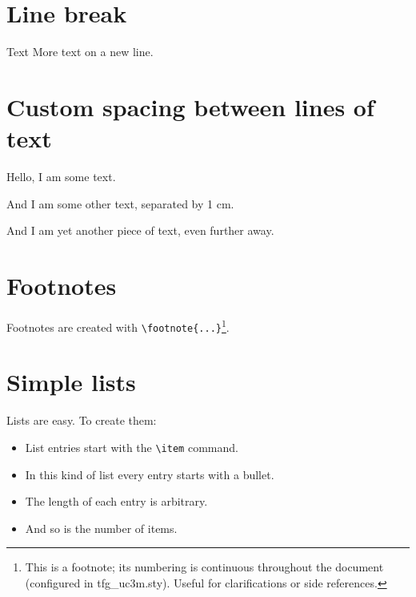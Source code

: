 \newpage


\section{Line break}

Text
\newline
More text on a new line.


\section{Custom spacing between lines of text}

Hello, I am some text.

\vspace{1cm}
And I am some other text, separated by 1 cm.

\vspace{50pt}
And I am yet another piece of text, even further away.


\section{Footnotes}

Footnotes are created with \verb|\footnote{...}|\footnote{This is a footnote; its numbering is continuous throughout the document (configured in tfg\_uc3m.sty). Useful for clarifications or side references.}.




\section{Simple lists}

Lists are easy. To create them:
\begin{itemize}
  \item List entries start with the \verb|\item| command.
  \item In this kind of list every entry starts with a bullet.
  \item The length of each entry is arbitrary.
  \item And so is the number of items.
\end{itemize}



